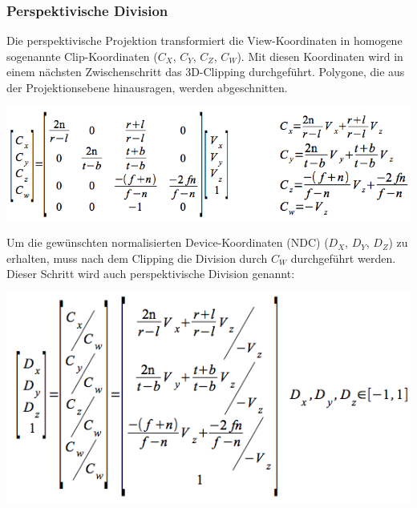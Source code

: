 \documentclass[10pt]{article}
\begin{document}
\subsubsection{Perspektivische Division}
Die perspektivische Projektion transformiert die View-Koordinaten in homogene sogenannte Clip-Koordinaten ($C_X$, $C_Y$, $C_Z$, $C_W$). Mit diesen Koordinaten wird in einem nächsten Zwischenschritt das 3D-Clipping durchgeführt. Polygone, die aus der Projektionsebene hinausragen, werden abgeschnitten.
\begin{center}
	\includegraphics[scale=0.3]{projektionstransformation4_1.png}
\end{center}
Um die gewünschten normalisierten Device-Koordinaten (NDC) ($D_X$, $D_Y$, $D_Z$) zu erhalten, muss nach dem Clipping die Division durch $C_W$ durchgeführt werden. Dieser Schritt wird auch perspektivische Division genannt:
\begin{center}
	\includegraphics[scale=0.3]{projektionstransformation4_2.png}
\end{center}
\end{document}
